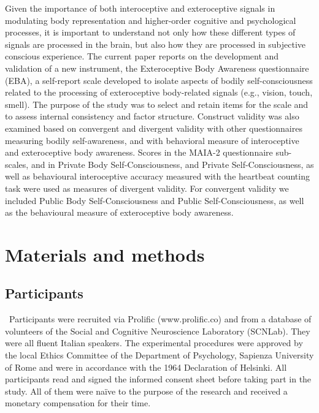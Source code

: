 \documentclass[man]{apa7}
\begin{document}
\par Given the importance of both interoceptive and exteroceptive signals in modulating body representation and higher-order cognitive and psychological processes, it is important to understand not only how these different types of signals are processed in the brain, but also how they are processed in subjective conscious experience. The current paper reports on the development and validation of a new instrument, the Exteroceptive Body Awareness questionnaire (EBA), a self-report scale developed to isolate aspects of bodily self-consciousness related to the processing of exteroceptive body-related signals (e.g., vision, touch, smell). The purpose of the study was to select and retain items for the scale and to assess internal consistency and factor structure. Construct validity was also examined based on convergent and divergent validity with other questionnaires measuring bodily self-awareness, and with behavioral measure of interoceptive and exteroceptive body awareness. 
Scores in the MAIA-2 questionnaire sub-scales, and in Private Body Self-Consciousness, and Private Self-Consciousness, as well as behavioural interoceptive accuracy measured with the heartbeat counting task were used as measures of divergent validity. For convergent validity we included Public Body Self-Consciousness and Public Self-Consciousness, as well as the behavioural measure of exteroceptive body awareness.
\section{Materials and methods}
\subsection{Participants}
\ Participants were recruited via Prolific (www.prolific.co) and from a database of volunteers of the Social and Cognitive Neuroscience Laboratory (SCNLab). They were all fluent Italian speakers. The experimental procedures were approved by the local Ethics Committee of the Department of Psychology, Sapienza University of Rome and were in accordance with the 1964 Declaration of Helsinki. All participants read and signed the informed consent sheet before taking part in the study. All of them were naïve to the purpose of the research and received a monetary compensation for their time.
\end{document}

